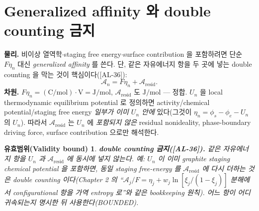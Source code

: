 \documentclass[11pt,a4paper]{article}
\newtheorem*{boundbox}{유효범위(Validity bound)}
\newcommand{\resid}{\mathrm{resid}}
\newcommand{\AL}[1]{\textsf{[AL-#1]}}
\begin{document}
\section{Generalized affinity 와 double counting 금지}\label{sec:ch3_genaff}
\textbf{물리.} 비이상 열역학$\cdot$staging free energy$\cdot$surface contribution 을 포함하려면 단순 $F\eta_n$
대신 \emph{generalized affinity} 를 쓴다. 단, 같은 자유에너지 항을 두 곳에 넣는 double counting 을 막는 것이
핵심이다(\AL{36}):
\begin{equation}
\mathcal A_n=F\eta_n+\mathcal A_{\resid}.
\label{eq:ch3_genaff}
\end{equation}
\textbf{차원.} $F\eta_n=\mathrm{(C/mol)\cdot V}=\mathrm{J/mol}$, $\mathcal A_{\resid}$ 도 $\mathrm{J/mol}$ — 정합.
$U_n$ 을 local thermodynamic equilibrium potential 로 정의하면 activity/chemical potential/staging free energy
\emph{일부가 이미 $U_n$ 안에} 있다(그것이 $\eta_n=\phi_s-\phi_e-U_n$ 의 $U_n$). 따라서 $\mathcal A_{\resid}$ 는
$U_n$ 에 \emph{포함되지 않은} residual nonideality, phase-boundary driving force, surface contribution 으로만
해석한다.
\begin{boundbox}
\textbf{double counting 금지(\AL{36}).} 같은 자유에너지 항을 $U_n$ 과 $\mathcal A_{\resid}$ 에 동시에 넣지
않는다. 예: $U_n$ 이 이미 graphite staging chemical potential 을 포함하면, 동일 staging free-energy 를
$\mathcal A_{\resid}$ 에 다시 더하는 것은 double counting 이다(Chapter 2 의 ``$\mathcal A_j/F=\eta_j+w_j\ln[\xi_j/(1-\xi_j)]$
분해에서 configurational 항을 가역 entropy 로''와 같은 bookkeeping 원칙). 어느 항이 어디 귀속되는지 명시한 뒤
사용한다(BOUNDED).
\end{boundbox}

\end{document}
